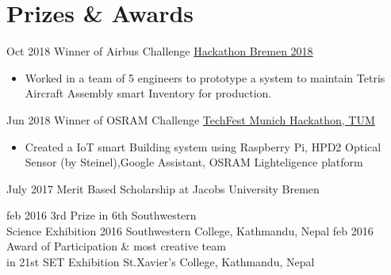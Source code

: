 \documentclass[letterpaper]{twentysecondcv} %
\begin{document}
\section{Prizes \& Awards}
\begin{twenty}
    \twentyitem
         {Oct 2018}
		{}
        {Winner of Airbus Challenge}
        {\href{https://www.hackathon-bremen.de}{Hackathon Bremen 2018}}
        {}
        {
        {\begin{itemize}
        \item Worked in a team of 5 engineers to prototype a system to maintain Tetris Aircraft Assembly smart Inventory for production. \\ 
         
        \end{itemize}}
        }
        
    \twentyitem
        {Jun 2018}
		{}
        {Winner of OSRAM Challenge}
        {\href{https://www.techfestmunich.com/2018}{TechFest Munich Hackathon, TUM}}
        {}
        {
        {\begin{itemize}
        \item Created a IoT smart Building system using Raspberry Pi, HPD2 Optical Sensor (by Steinel),Google Assistant, OSRAM Lighteligence platform\\
         
        \end{itemize}}
        }
        
     \twentyitem
        {July 2017}
		{}
        {Merit Based Scholarship at Jacobs University Bremen}
        {}
        {}
        {
        }
        
    \twentyitem
        {feb 2016}
		{}
        {3rd Prize in 6th Southwestern \\Science Exhibition 2016 }
        {Southwestern College, Kathmandu, Nepal}
        {}
        {
        }
     \twentyitem
        {feb 2016}
		{}
        {Award of Participation \& most creative team\\ in 21st SET Exhibition}
        {St.Xavier's College, Kathmandu, Nepal}
        {}
        {
        }
        \begin{comment}
        \twentyitem
        {feb 2016}
		{}
        {Letter of Appreciation in 5th Trinity\\ Sci-Tech Exhibition}
        {Trinity Intl' College, Kathmandu, Nepal}
        {}
        {
        }
        \end{comment}
\end{twenty}
\end{document}
